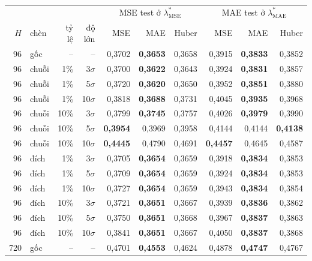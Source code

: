 \begin{tabular}{@{}r l r r rrr rrr@{}}
\toprule
 & & & & \multicolumn{3}{c}{MSE test ở $\lambda^*_{\mathrm{MSE}}$} & \multicolumn{3}{c}{MAE test ở $\lambda^*_{\mathrm{MAE}}$} \\
\cmidrule(lr){5-7}\cmidrule(l){8-10}
$H$ & chèn & tỷ lệ & độ lớn & MSE & MAE & Huber & MSE & MAE & Huber \\
\midrule
96 & gốc & -- & -- & 0{,}3702 & \textbf{0{,}3653} & 0{,}3658 & 0{,}3915 & \textbf{0{,}3833} & 0{,}3852 \\
96 & chuỗi & 1\% & 3$\sigma$ & 0{,}3700 & \textbf{0{,}3622} & 0{,}3643 & 0{,}3924 & \textbf{0{,}3831} & 0{,}3857 \\
96 & chuỗi & 1\% & 5$\sigma$ & 0{,}3720 & \textbf{0{,}3620} & 0{,}3650 & 0{,}3952 & \textbf{0{,}3851} & 0{,}3880 \\
96 & chuỗi & 1\% & 10$\sigma$ & 0{,}3818 & \textbf{0{,}3688} & 0{,}3731 & 0{,}4045 & \textbf{0{,}3935} & 0{,}3968 \\
96 & chuỗi & 10\% & 3$\sigma$ & 0{,}3799 & \textbf{0{,}3745} & 0{,}3757 & 0{,}4026 & \textbf{0{,}3979} & 0{,}3990 \\
96 & chuỗi & 10\% & 5$\sigma$ & \textbf{0{,}3954} & 0{,}3969 & 0{,}3958 & 0{,}4144 & 0{,}4144 & \textbf{0{,}4138} \\
96 & chuỗi & 10\% & 10$\sigma$ & \textbf{0{,}4445} & 0{,}4790 & 0{,}4691 & \textbf{0{,}4457} & 0{,}4645 & 0{,}4587 \\
96 & đích & 1\% & 3$\sigma$ & 0{,}3705 & \textbf{0{,}3654} & 0{,}3659 & 0{,}3918 & \textbf{0{,}3834} & 0{,}3853 \\
96 & đích & 1\% & 5$\sigma$ & 0{,}3709 & \textbf{0{,}3654} & 0{,}3659 & 0{,}3924 & \textbf{0{,}3834} & 0{,}3853 \\
96 & đích & 1\% & 10$\sigma$ & 0{,}3727 & \textbf{0{,}3654} & 0{,}3659 & 0{,}3943 & \textbf{0{,}3834} & 0{,}3854 \\
96 & đích & 10\% & 3$\sigma$ & 0{,}3721 & \textbf{0{,}3651} & 0{,}3667 & 0{,}3939 & \textbf{0{,}3836} & 0{,}3862 \\
96 & đích & 10\% & 5$\sigma$ & 0{,}3750 & \textbf{0{,}3651} & 0{,}3668 & 0{,}3967 & \textbf{0{,}3837} & 0{,}3863 \\
96 & đích & 10\% & 10$\sigma$ & 0{,}3841 & \textbf{0{,}3651} & 0{,}3667 & 0{,}4050 & \textbf{0{,}3837} & 0{,}3868 \\
\midrule
720 & gốc & -- & -- & 0{,}4701 & \textbf{0{,}4553} & 0{,}4624 & 0{,}4878 & \textbf{0{,}4747} & 0{,}4767 \\

\end{tabular}
